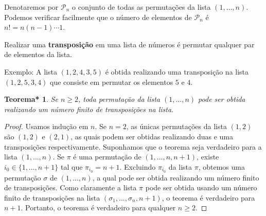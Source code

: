 \documentclass[12pt,a4paper]{report}
\newcommand{\mc}{\mathcal}
\newtheorem{thm*}[thm]{Teorema*}
\begin{document}
Denotaremos por $\mc P_n$ o conjunto de todas as permutações da lista $(1,\ldots,n)$. Podemos verificar facilmente que o número de elementos de $\mc P_n$ é $n!=n(n-1)\cdots 1$.

Realizar uma \textbf{transposição} em uma lista de números é permutar qualquer par de elementos da lista.

Exemplo: A lista $(1,2,4,3,5)$ é obtida realizando uma transposição na lista $(1,2,5,3,4)$ que consiste em permutar os elementos $5$ e $4$.

\begin{thm*}
  Se $n\ge 2$, toda permutação da lista $(1,\ldots,n)$ pode ser obtida realizando um número finito de transposições na lista.
\end{thm*}
\begin{proof}
  Usamos indução em $n$. Se $n=2$, as únicas permutações da lista $(1,2)$ são $(1,2)$ e $(2,1)$, as quais podem ser obtidas realizando duas e uma transposições respectivamente. Suponhamos que o teorema seja verdadeiro para a lista $(1,\ldots,n)$. Se $\pi$ é uma permutação de $(1,\ldots,n,n+1)$, existe $i_0\in\{1,\ldots,n+1\}$ tal que $\pi_{i_0}=n+1$.
  Excluindo $\pi_{i_0}$ da lista $\pi$, obtemos uma permutação $\sigma$ de $(1,\ldots,n)$, a qual pode ser obtida realizando um número finito de transposições. Como claramente a lista $\pi$ pode ser obtida usando um número finito de transposições na lista $(\sigma_1,\ldots,\sigma_n,n+1)$, o teorema é verdadeiro para $n+1$. Portanto, o teorema é verdadeiro para qualquer $n\ge 2$.
\end{proof}
\end{document}
